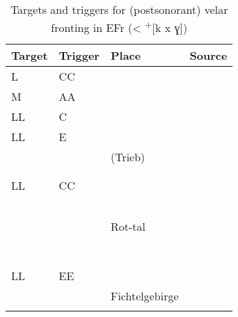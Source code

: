\begin{table}
\caption{Targets and triggers for (postsonorant) velar fronting in EFr (< \textsuperscript{+}[k x ɣ])}
\label{tab:12.7}

\begin{tabularx}{\textwidth}{llQQ}
\lsptoprule
Target  & Trigger  & Place & Source\\\midrule
L & CC &   & \citet{Roedder1936}\\
M & AA &   & \citet{Kaupert1914}\\
LL & C &   & \citet{Diegritz1971}\\
LL & E &              & \citet{Bock1965}   \\
   &   &   (Trieb)   &  \citet{Gerbet1908}\\
   &   &    &  \citet{Dellit1913}\\
   &   &                 &  \citet{Kober1962}\\
LL & CC &          & \citet{Hedrich1891}     \\
   &    &             &\citet{HertelHertel1902}  \\
   &    &              &\citet{Dietzel1908}       \\
   &    &               &\citet{Batz1911}          \\
   &    &           &\citet{Heilig1912}        \\
   &    &              &\citet{MSchmidt1912}      \\
   &    & Rot-tal                   &\citet{Knupfer1912}       \\
   &    &           &\citet{Werner1961}        \\
   &    &              &\citet{Sander1916}        \\
   &    &        &\citet{Steger1968}        \\
   &    &              &\citet{Hirsch1971}        \\
   &    &          &\citet{Trukenbrod1973}    \\
   &    &             &\citet{Jakob1985}         \\
   &    &             &\citet{Schnabel2000}\\
LL & EE &  &     \citet{Blumenstock1911}       \\
   &    & Fichtelgebirge & \citet{Meinel1932}\\
\lspbottomrule
\end{tabularx}
\end{table}


